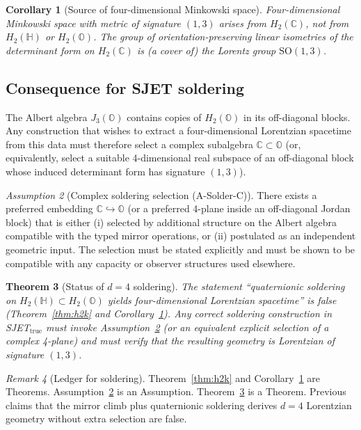 \documentclass[11pt]{article}
\theoremstyle{plain}
\newtheorem{theorem}{Theorem}[section]
\newtheorem{corollary}[theorem]{Corollary}
\theoremstyle{definition}
\theoremstyle{remark}
\newtheorem{remark}[theorem]{Remark}
\newtheorem{assumption}[theorem]{Assumption}
\numberwithin{equation}{section}
\newcommand{\C}{\mathbb{C}}
\newcommand{\Quat}{\mathbb{H}}
\newcommand{\Oct}{\mathbb{O}}
\begin{document}
\begin{corollary}[Source of four-dimensional Minkowski space]\label{cor:mink4}
Four-dimensional Minkowski space with metric of signature $(1,3)$ arises from $H_2(\C)$, not from $H_2(\Quat)$ or $H_2(\Oct)$. The group of orientation-preserving linear isometries of the determinant form on $H_2(\C)$ is (a cover of) the Lorentz group $\mathrm{SO}(1,3)$.
\end{corollary}

\subsection{Consequence for SJET soldering}

The Albert algebra $J_3(\Oct)$ contains copies of $H_2(\Oct)$ in its off-diagonal blocks. Any construction that wishes to extract a four-dimensional Lorentzian spacetime from this data must therefore select a complex subalgebra $\C\subset\Oct$ (or, equivalently, select a suitable 4-dimensional real subspace of an off-diagonal block whose induced determinant form has signature $(1,3)$).

\begin{assumption}[Complex soldering selection (A-Solder-C)]\label{asm:solder-c}
There exists a preferred embedding $\C\hookrightarrow\Oct$ (or a preferred 4-plane inside an off-diagonal Jordan block) that is either (i) selected by additional structure on the Albert algebra compatible with the typed mirror operations, or (ii) postulated as an independent geometric input. The selection must be stated explicitly and must be shown to be compatible with any capacity or observer structures used elsewhere.
\end{assumption}

\begin{theorem}[Status of $d=4$ soldering]\label{thm:soldering-status}
The statement ``quaternionic soldering on $H_2(\Quat)\subset H_2(\Oct)$ yields four-dimensional Lorentzian spacetime'' is false (Theorem~\ref{thm:h2k} and Corollary~\ref{cor:mink4}). Any correct soldering construction in SJET$_{\mathrm{true}}$ must invoke Assumption~\ref{asm:solder-c} (or an equivalent explicit selection of a complex 4-plane) and must verify that the resulting geometry is Lorentzian of signature $(1,3)$.
\end{theorem}

\begin{remark}[Ledger for soldering]
Theorem~\ref{thm:h2k} and Corollary~\ref{cor:mink4} are Theorems. Assumption~\ref{asm:solder-c} is an Assumption. Theorem~\ref{thm:soldering-status} is a Theorem. Previous claims that the mirror climb plus quaternionic soldering derives $d=4$ Lorentzian geometry without extra selection are false.
\end{remark}
\end{document}
